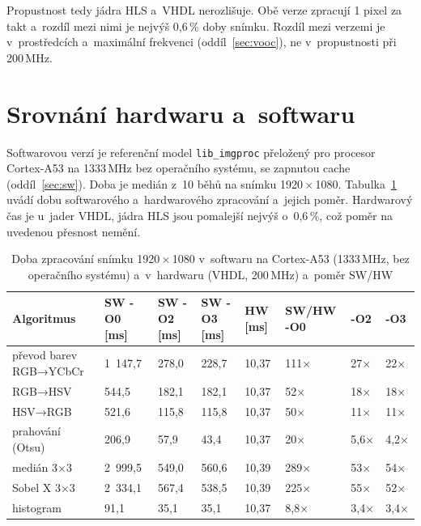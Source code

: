 
Propustnost tedy jádra HLS a~VHDL nerozlišuje. Obě verze zpracují 1 pixel za takt a~rozdíl mezi nimi je nejvýš 0,6\,\% doby snímku. Rozdíl mezi verzemi je v~prostředcích a~maximální frekvenci (oddíl~\ref{sec:vooc}), ne v~propustnosti při 200\,MHz.

\section{Srovnání hardwaru a~softwaru}
\label{sec:vhwsw}

Softwarovou verzí je referenční model \texttt{lib\_imgproc} přeložený pro procesor Cortex-A53 na 1333\,MHz bez operačního systému, se zapnutou cache (oddíl~\ref{sec:sw}). Doba je medián z~10 běhů na snímku 1920\,×\,1080. Tabulka~\ref{tab:hwsw} uvádí dobu softwarového a~hardwarového zpracování a~jejich poměr. Hardwarový čas je u~jader VHDL, jádra HLS jsou pomalejší nejvýš o~0,6\,\%, což poměr na uvedenou přesnost nemění.


\begin{table}[htbp]
    \centering
    \caption{Doba zpracování snímku 1920\,×\,1080 v~softwaru na Cortex-A53 (1333\,MHz, bez operačního systému) a~v~hardwaru (VHDL, 200\,MHz) a~poměr SW/HW}
    \label{tab:hwsw}
    \begin{tabular}{p{3.4cm}p{1.4cm}p{1.4cm}p{1.4cm}p{1.3cm}p{1.3cm}p{1.3cm}p{1.3cm}}
        \toprule
        Algoritmus & SW -O0 [ms] & SW -O2 [ms] & SW -O3 [ms] & HW [ms] & SW/HW -O0 & -O2 & -O3 \\
        \midrule
        převod barev RGB→YCbCr & 1 147,7 & 278,0 & 228,7 & 10,37 & 111× & 27× & 22× \\
        RGB→HSV & 544,5 & 182,1 & 182,1 & 10,37 & 52× & 18× & 18× \\
        HSV→RGB & 521,6 & 115,8 & 115,8 & 10,37 & 50× & 11× & 11× \\
        prahování (Otsu) & 206,9 & 57,9 & 43,4 & 10,37 & 20× & 5,6× & 4,2× \\
        medián 3×3 & 2 999,5 & 549,0 & 560,6 & 10,39 & 289× & 53× & 54× \\
        Sobel X 3×3 & 2 334,1 & 567,4 & 538,5 & 10,39 & 225× & 55× & 52× \\
        histogram & 91,1 & 35,1 & 35,1 & 10,37 & 8,8× & 3,4× & 3,4× \\
        \bottomrule
    \end{tabular}
\end{table}

